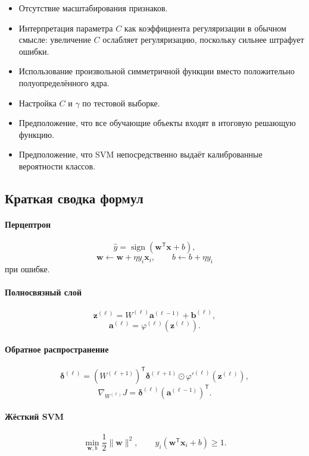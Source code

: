 \documentclass[12pt,a4paper]{article}
\theoremstyle{definition}
\newcommand{\T}{\mathsf{T}}
\newcommand{\1}{\mathbf{1}}
\DeclareMathOperator{\sign}{sign}
\begin{document}
\begin{itemize}
    \item Отсутствие масштабирования признаков.
    \item Интерпретация параметра $C$ как коэффициента регуляризации
    в обычном смысле: увеличение $C$ ослабляет регуляризацию,
    поскольку сильнее штрафует ошибки.
    \item Использование произвольной симметричной функции вместо
    положительно полуопределённого ядра.
    \item Настройка $C$ и $\gamma$ по тестовой выборке.
    \item Предположение, что все обучающие объекты входят в итоговую
    решающую функцию.
    \item Предположение, что SVM непосредственно выдаёт
    калиброванные вероятности классов.
\end{itemize}

\subsection{Краткая сводка формул}

\paragraph{Перцептрон}
\[
    \widehat{y}
    =
    \sign(\bm{w}^{\T}\bm{x}+b),
\]
\[
    \bm{w}\gets\bm{w}+\eta y_i\bm{x}_i,
    \qquad
    b\gets b+\eta y_i
\]
при ошибке.

\paragraph{Полносвязный слой}
\[
    \bm{z}^{(\ell)}
    =
    W^{(\ell)}\bm{a}^{(\ell-1)}
    +
    \bm{b}^{(\ell)},
\]
\[
    \bm{a}^{(\ell)}
    =
    \varphi^{(\ell)}(\bm{z}^{(\ell)}).
\]

\paragraph{Обратное распространение}
\[
    \bm{\delta}^{(\ell)}
    =
    (W^{(\ell+1)})^{\T}
    \bm{\delta}^{(\ell+1)}
    \odot
    \varphi'^{(\ell)}(\bm{z}^{(\ell)}),
\]
\[
    \nabla_{W^{(\ell)}}J
    =
    \bm{\delta}^{(\ell)}
    (\bm{a}^{(\ell-1)})^{\T}.
\]

\paragraph{Жёсткий SVM}
\[
    \min_{\bm{w},b}
    \frac{1}{2}\|\bm{w}\|^2,
    \qquad
    y_i(\bm{w}^{\T}\bm{x}_i+b)\geq1.
\]
\end{document}
